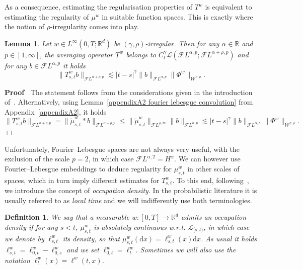\documentclass[10pt]{article}
\newcommand{\mathd}{\mathrm{d}}
\newcommand{\tmtextit}[1]{{\itshape{#1}}}
\newenvironment{proof}{\noindent\textbf{Proof\ }}{\hspace*{\fill}$\Box$\medskip}
\newtheorem{definition}[theorem]{Definition}
\newtheorem{lemma}[theorem]{Lemma}
\begin{document}
As a consequence, estimating the regularisation properties of $T^w$ is
equivalent to estimating the regularity of $\mu^w$ in suitable function
spaces. This is exactly where the notion of $\rho$\mbox{-}irregularity comes
into play.

\begin{lemma}
  \label{sec2.2 lemma regularity averaging 1}Let $w \in L^{\infty} (0, T ;
  \mathbb{R}^d)$ be $(\gamma, \rho)$\mbox{-}irregular. Then for any $\alpha
  \in \mathbb{R}$ and $p \in [1, \infty]$, the averaging operator $T^w$
  belongs to $C^{\gamma}_t \mathcal{L} (\mathcal{F} L^{\alpha, p} ;
  \mathcal{F} L^{\alpha + \rho, p})$ and for any $b \in \mathcal{F} L^{\alpha,
  p}$ it holds
  \begin{equation}
    \| T^w_{s, t} b \|_{\mathcal{F} L^{\alpha + \rho, p}} \lesssim | t - s
    |^{\gamma} \| b \|_{\mathcal{F} L^{\alpha, p}} \| \Phi^w
    \|_{\mathcal{W}^{\gamma, \rho}} .
  \end{equation}
\end{lemma}

\begin{proof}
  The statement follows from the considerations given in the introduction
  of~{\cite{catelliergubinelli}}. Alternatively, using Lemma~\ref{appendixA2
  fourier lebesgue convolution} from Appendix~\ref{appendixA2}, it holds
  \[ \| T^w_{s, t} b \|_{\mathcal{F} L^{\alpha + \rho, p}} = \|
     \tilde{\mu}^w_{s, t} \ast b \|_{\mathcal{F} L^{\alpha + \rho, p}}
     \leqslant \| \tilde{\mu}^w_{s, t} \|_{\mathcal{F} L^{\rho, \infty}}  \| b
     \|_{\mathcal{F} L^{\alpha, p}} \lesssim | t - s |^{\gamma} \| b
     \|_{\mathcal{F} L^{\alpha, p}} \| \Phi^w \|_{\mathcal{W}^{\gamma, \rho}}
     . \]
\end{proof}

Unfortunately, Fourier--Lebesgue spaces are not always very useful, with the
exclusion of the scale $p = 2$, in which case $\mathcal{F} L^{\alpha, 2} =
H^{\alpha}$. We can however use Fourier--Lebesgue embeddings to deduce
regularity for $\mu^w_{s, t}$ in other scales of spaces, which in turn imply
different estimates for $T^w_{s, t}$. To this end, following~{\cite{geman}},
we introduce the concept of \tmtextit{occupation density}. In the
probabilistic literature it is usually referred to as \tmtextit{local time}
and we will indifferently use both terminologies.

\begin{definition}
  \label{sec2.2 defn occupation density}We say that a measurable $w : [0, T]
  \rightarrow \mathbb{R}^d$ admits an occupation density if for any $s < t$,
  $\mu^w_{s, t}$ is absolutely continuous w.r.t. $\mathcal{L}_{[s, t)}$, in
  which case we denote by $\ell^w_{s, t}$ its density, so that $\mu^w_{s, t}
  (\mathd x) = \ell^w_{s, t} (x) \mathd x$. As usual it holds $\ell^w_{s, t} =
  \ell^w_{0, t} - \ell^w_{0, s}$ and we set $\ell^w_{0, t} = \ell^w_t$.
  Sometimes we will also use the notation $\ell^w_t (x) = \ell^w (t, x)$.
\end{definition}
\end{document}
